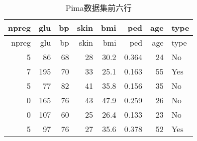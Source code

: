 \documentclass[]{article}
\begin{document}
\begin{longtable}[]{@{}rrrrrrrl@{}}
\caption{Pima数据集前六行}\tabularnewline
\toprule
npreg & glu & bp & skin & bmi & ped & age & type\tabularnewline
\midrule
\endfirsthead
\toprule
npreg & glu & bp & skin & bmi & ped & age & type\tabularnewline
\midrule
\endhead
5 & 86 & 68 & 28 & 30.2 & 0.364 & 24 & No\tabularnewline
7 & 195 & 70 & 33 & 25.1 & 0.163 & 55 & Yes\tabularnewline
5 & 77 & 82 & 41 & 35.8 & 0.156 & 35 & No\tabularnewline
0 & 165 & 76 & 43 & 47.9 & 0.259 & 26 & No\tabularnewline
0 & 107 & 60 & 25 & 26.4 & 0.133 & 23 & No\tabularnewline
5 & 97 & 76 & 27 & 35.6 & 0.378 & 52 & Yes\tabularnewline
\bottomrule
\end{longtable}
\end{document}
